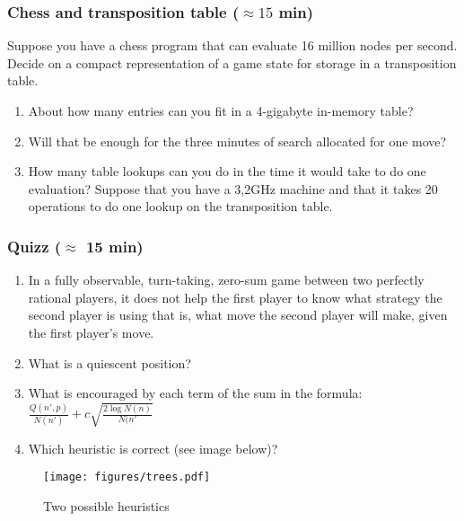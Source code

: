 \documentclass[a4paper, 10pt]{article}
\begin{document}
\subsubsection{Chess and transposition table ($\approx 15$ min)}
Suppose you have a chess program that can evaluate 16 million nodes per second.
Decide on a compact representation of a game state for storage in a transposition table.
\begin{enumerate}
    \item About how many entries can you fit in a 4-gigabyte in-memory table?
    \item Will that be enough for the three minutes of search allocated for one move?
    \item How many table lookups can you do in the time it would take to do one evaluation? Suppose that you have a 3,2GHz machine and that it takes 20 operations to do one lookup on the transposition table.
\end{enumerate}

   \subsubsection{Quizz ($\approx$ 15 min)}
   \begin{enumerate}
       \item In a fully observable, turn-taking, zero-sum game between two perfectly rational players, it does not help the first player to know what strategy the second player is using that is, what move the second player will make, given the first player’s move.
       \item What is a quiescent position?
       \item What is encouraged by each term of the sum in the formula: $\frac{Q(n', p)}{N(n')} + c\sqrt{\frac{2\log N(n)}{N(n'}}$
       \item Which heuristic is correct (see image below)?
   \end{enumerate}
   \begin{figure}[H]
       \centering
       \texttt{[image: figures/trees.pdf]}
       \caption{Two possible heuristics}
       \label{fig:my_label}
   \end{figure}
\end{document}

